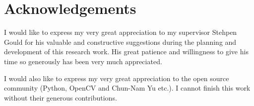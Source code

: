 
\chapter*{Acknowledgements}
\label{cha:ack}

I would like to express my very great appreciation to my
supervisor Stehpen Gould for his valuable and constructive
suggestions during the planning and development of this
research work. His great patience and willingness to give
his time so generously has been very much appreciated.

I would also like to express my very great appreciation to the
open source community (Python, OpenCV and Chun-Nam Yu etc.). I
cannot finish this work without their generous contributions.


